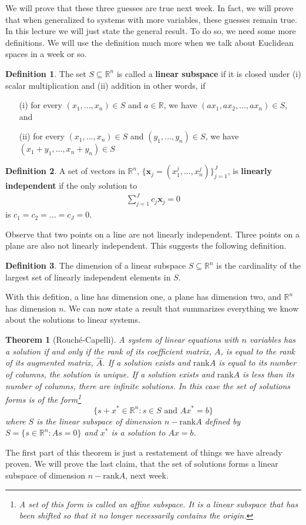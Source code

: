 \documentclass[12pt,reqno]{amsart}
\newcommand{\rank}{\mathrm{rank}}
\newtheorem{theorem}{Theorem}[section]
\theoremstyle{definition}
\newtheorem{definition}{Definition}[section]
\begin{document}
We will prove that these three guesses are true next week. In fact, we
will prove that when generalized to systems with more variables, these
guesses remain true. In this lecture we will just state the general
result. To do so, we need some more definitions. We will use the
definition much more when we talk about Euclidean spaces in a week or
so.
\begin{definition}
  The set $S \subseteq \mathbb{R}^n$ is called a \textbf{linear
    subspace} if it is closed under (i) scalar multiplication and (ii)
  addition in other words, if 
  \begin{itemize}
  \item[(i)] for every $(x_1, ..., x_n)\in S$ and $a \in \mathbb{R}$,
    we have $(a x_1, a x_2, ..., a x_n) \in S$, and
  \item[(ii)] for every $(x_1, ..., x_n)\in S$ and $(y_1, ..., y_n)\in
    S$, we have
    $(x_1 + y_1, ..., x_n + y_n)  \in S$
  \end{itemize}
\end{definition}
\begin{definition}
  A set of vectors in $\mathbb{R}^n$, $\{\textbf{x}_j = (x^j_1,...,
  x^j_n)\}_{j=1}^J$, is \textbf{linearly independent} if the only
  solution to 
  \begin{align*}
    \sum_{j=1}^J c_j \textbf{x}_j = 0 
  \end{align*}
  is $c_1 = c_2 = ... = c_J = 0$. 
\end{definition}
Observe that two points on a line are not linearly independent. Three
points on a plane are also not linearly independent. This suggests the
following definition.
\begin{definition}
  The dimension of a linear subspace $S \subseteq \mathbb{R}^n$ is the
  cardinality of the largest set of linearly independent elements in
  $S$. 
\end{definition} 
With this defition, a line has dimension one, a plane has dimension
two, and $\mathbb{R}^n$ has dimension $n$. We can now state a result
that summarizes everything we know about the solutions to linear
systems. 
\begin{theorem}[Rouch\'{e}-Capelli] \label{thm:rc} A system of linear
  equations with $n$ variables has a solution if and only if the rank
  of its coefficient matrix, $A$, is equal to the rank of its
  augmented matrix, $\hat{A}$. If a solution exists and $\rank A$ is
  equal to its number of columns, the solution is unique. If a
  solution exists and $\rank A$ is less than its number of columns,
  there are infinite solutions. In this case the set of solutions
  forms is of the form\footnote{A set of this form is called an affine
    subspace. It is a linear subspace that has been shifted so that it
    no longer necessarily contains the origin.}
  \[ 
  \{s+x^* \in \mathbb{R}^n : s \in S \text{ and } Ax^* = b \} 
  \]
  where $S$ is the linear subspace of dimension $n - \rank A$ defined
  by $S = \{s \in \mathbb{R}^n: As = 0 \}$ and $x^*$
  is a solution to $A x = b$.
\end{theorem}
The first part of this theorem is just a restatement of things we have
already proven. We will prove the last claim, that the set of solutions
forms a linear subspace of dimension $n - \rank A$, next week.
\end{document}
